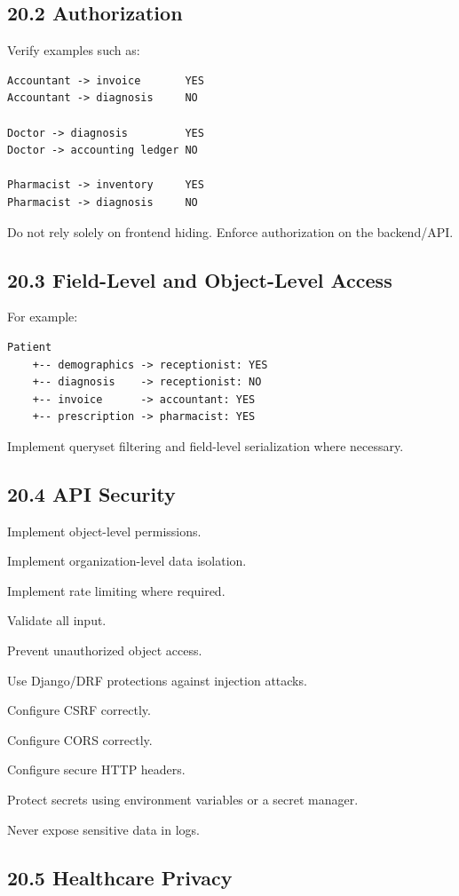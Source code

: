 \documentclass[11pt,a4paper]{article}
\newcommand{\task}[1]{\item[$\square$] #1}
\begin{document}
\subsection{20.2 Authorization}

Verify examples such as:

\begin{lstlisting}
Accountant -> invoice       YES
Accountant -> diagnosis     NO

Doctor -> diagnosis         YES
Doctor -> accounting ledger NO

Pharmacist -> inventory     YES
Pharmacist -> diagnosis     NO
\end{lstlisting}

Do not rely solely on frontend hiding. Enforce authorization on the
backend/API.

\subsection{20.3 Field-Level and Object-Level Access}

For example:

\begin{lstlisting}
Patient
    +-- demographics -> receptionist: YES
    +-- diagnosis    -> receptionist: NO
    +-- invoice      -> accountant: YES
    +-- prescription -> pharmacist: YES
\end{lstlisting}

Implement queryset filtering and field-level serialization where necessary.

\subsection{20.4 API Security}

\task{Implement object-level permissions.}
\task{Implement organization-level data isolation.}
\task{Implement rate limiting where required.}
\task{Validate all input.}
\task{Prevent unauthorized object access.}
\task{Use Django/DRF protections against injection attacks.}
\task{Configure CSRF correctly.}
\task{Configure CORS correctly.}
\task{Configure secure HTTP headers.}
\task{Protect secrets using environment variables or a secret manager.}
\task{Never expose sensitive data in logs.}

\subsection{20.5 Healthcare Privacy}
\end{document}
